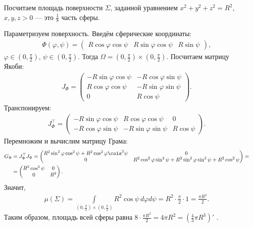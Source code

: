 \begin{exmpl}
 Посчитаем площадь поверхности $\Sigma$, заданной уравнением $x^{2} + y^{2} + z^{2} = R^{2}$, $x, y, z > 0$ --- это $\frac{1}{8}$ часть сферы.

 Параметризуем поверхность. Введём сферические координаты:
 \begin{align*}
  \Phi(\varphi, \psi) = \begin{pmatrix}
   R \cos \varphi \cos \psi & R \sin\varphi \cos \psi & R \sin \psi
  \end{pmatrix}
 ,\end{align*}  $\varphi \in (0, \frac{\pi}{2})$, $\psi \in (0, \frac{\pi}{2})$. Тогда $\Omega = (0, \frac{\pi}{2}) \times (0, \frac{\pi}{2})$. Посчитаем матрицу Якоби:
 \begin{align*}
  J_{\Phi} = \begin{pmatrix}
   -R \sin \varphi \cos \psi & -R  \cos \varphi \sin \psi \\
   R \cos \varphi \cos \psi & -R \sin \varphi \sin \psi \\
   0 & R \cos \psi
  \end{pmatrix}
 .\end{align*} Транспонируем:
 \begin{align*}
  J_{\Phi}^{\top} = \begin{pmatrix}
   -R \sin \varphi \cos \psi & R \cos \varphi \cos \psi & 0 \\
   -R  \cos \varphi \sin \psi & -R \sin \varphi \sin \psi & R \cos \psi 
  \end{pmatrix}
 .\end{align*} Перемножим и вычислим матрицу Грама:
 \begin{align*}
  G_{\Phi} &= J_{\Phi}^{\top} J_{\Phi} = \begin{pmatrix}
   R^{2} \sin^{2} \varphi \cos^{2} \psi + R^{2} \cos^{2} \varphi \cois^{2} \psi & 0 \\
   0 & R^{2}\cos^{2}\varphi \sin^{2}\psi + R^{2} \sin^2 \varphi \sin^{2} \psi + R^{2} \cos^{2} \psi
  \end{pmatrix} = \\
  &= \begin{pmatrix}
   R^{2} \cos^{2} \psi & 0 \\
   0 & R^{2}
  \end{pmatrix}
 .\end{align*} Значит, 
 \begin{align*}
  \mu(\Sigma) = \int\limits_{(0, \frac{\pi}{2}) \times (0, \frac{\pi}{2})} R^{2} \cos\psi  \, d\varphi d\psi = R^{2} \cdot \frac{\pi}{2} \cdot 1 = \frac{\pi R^{2}}{2}
 .\end{align*} Таким образом, площадь всей сферы равна $8 \cdot \frac{\pi R^{2}}{2} = 4 \pi R^{2} = \left( \frac{4}{3} \pi R^{3} \right)'$ .
\end{exmpl}
